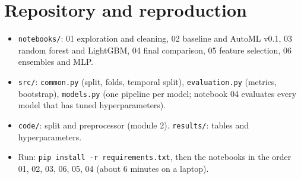 \documentclass[11pt,a4paper]{article}
\begin{document}
\section{Repository and reproduction}
\begin{itemize}
\item \texttt{notebooks/}: 01 exploration and cleaning, 02 baseline and AutoML v0.1, 03 random forest and LightGBM,
04 final comparison, 05 feature selection, 06 ensembles and MLP.
\item \texttt{src/}: \texttt{common.py} (split, folds, temporal split), \texttt{evaluation.py} (metrics, bootstrap),
\texttt{models.py} (one pipeline per model; notebook 04 evaluates every model that has tuned hyperparameters).
\item \texttt{code/}: split and preprocessor (module 2). \texttt{results/}: tables and hyperparameters.
\item Run: \texttt{pip install -r requirements.txt}, then the notebooks in the order 01, 02, 03, 06, 05, 04 (about 6 minutes on a laptop).
\end{itemize}
\end{document}
